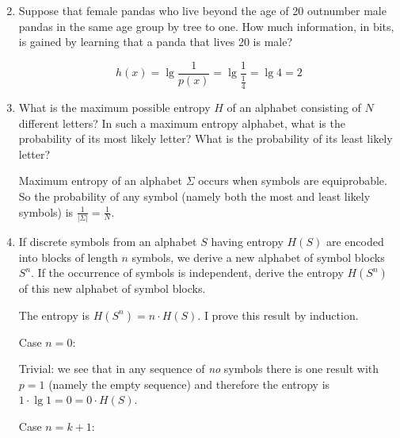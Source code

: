 \documentclass[10pt,\jkfside,a4paper]{article}
\begin{document}
\begin{enumerate}

    \setcounter{enumi}{1}

    \item Suppose that female pandas who live beyond the age of 20 outnumber male pandas in the same age group by tree to one. How much information, in bits, is gained by learning that a panda that lives 20 is
    male?

    \[
        h(x) = \lg\frac{1}{p(x)} = \lg \frac{1}{\frac{1}{4}} = \lg 4 = 2
    \]

    \item What is the maximum possible entropy $H$ of an alphabet consisting of $N$ different letters? In such a maximum entropy alphabet, what is the probability of its most likely letter? What is the
    probability of its least likely letter?

    Maximum entropy of an alphabet $\Sigma$ occurs when symbols are equiprobable. So the probability of any symbol (namely both the most and least likely symbols) is $\frac{1}{|\Sigma|} = \frac{1}{N}$.

    \item If discrete symbols from an alphabet $S$ having entropy $H(S)$ are encoded into blocks of length $n$ symbols, we derive a new alphabet of symbol blocks $S^n$. If the occurrence of symbols is
    independent, derive the entropy $H(S^n)$ of this new alphabet of symbol blocks.

    The entropy is $H(S^n) = n\cdot H(S)$. I prove this result by induction.

    Case $n = 0$:

    Trivial: we see that in any sequence of \textit{no} symbols there is one result with $p = 1$ (namely the empty sequence) and therefore the entropy is $1 \cdot \lg 1 = 0 = 0 \cdot H(S)$.

    Case $n = k + 1$:


\end{enumerate}
\end{document}
